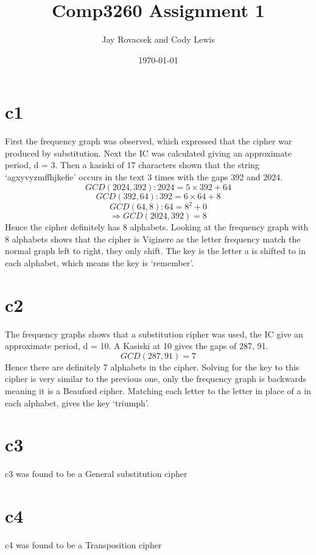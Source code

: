 \documentclass{article}
\title{Comp3260 Assignment 1}
\author{Jay Rovacsek and Cody Lewis}
\date{\today}
\begin{document}
  \maketitle

  \section{c1}
    First the frequency graph was observed, which expressed that the cipher
    war produced by substitution. Next the IC was calculated giving an 
    approximate period, d = 3. Then a kasiski of 17 characters shown that the
    string `agxyvyzmffhjkefie' occurs in the text 3 times with the gaps
    392 and 2024.
      \[ GCD(2024,392): 2024 = 5 \times 392 + 64 \] 
      \[ GCD(392,64): 392 = 6 \times 64 + 8 \] 
      \[ GCD(64,8): 64 = 8^2 + 0 \] 
      \[ \Rightarrow GCD(2024,392) = 8 \] 
    Hence the cipher definitely has 8 alphabets. Looking at the frequency 
    graph with 8 alphabets shows that the cipher is Viginere as the letter 
    frequency match the normal graph left to right, they only shift. The 
    key is the letter a is shifted to in each alphabet, which means the key 
    is `remember'.
  \section{c2}
    The frequency graphs shows that a substitution cipher was used, the IC
    give an approximate period, d = 10. A Kasiski at 10 gives the gaps of 287,
    91.
      \[ GCD(287,91) = 7 \]
    Hence there are definitely 7 alphabets in the cipher. Solving for the key
    to this cipher is very similar to the previous one, only the frequency 
    graph is backwards meaning it is a Beauford cipher. Matching each letter
    to the letter in place of a in each alphabet, gives the key `triumph'.
  \section{c3}
    c3 was found to be a General substitution cipher
  \section{c4}
    c4 was found to be a Transposition cipher
\end{document}
